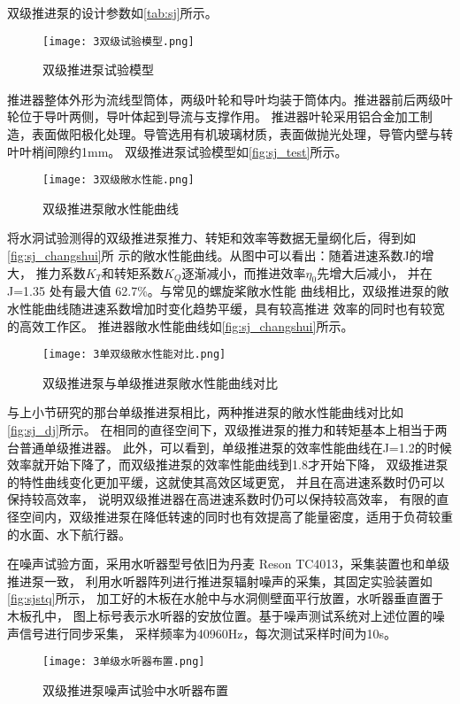 双级推进泵的设计参数如\autoref{tab:sj}所示。
\begin{figure}[htbp]
    \centering
    \texttt{[image: 3双级试验模型.png]}
    \caption{\label{fig:sj_test}双级推进泵试验模型}
\end{figure}
推进器整体外形为流线型筒体，两级叶轮和导叶均装于筒体内。推进器前后两级叶轮位于导叶两侧，导叶体起到导流与支撑作用。
推进器叶轮采用铝合金加工制造，表面做阳极化处理。导管选用有机玻璃材质，表面做抛光处理，导管内壁与转叶叶梢间隙约1mm。
双级推进泵试验模型如\autoref{fig:sj_test}所示。
\begin{figure}[htbp]
    \centering
    \texttt{[image: 3双级敞水性能.png]}
    \caption{\label{fig:sj_changshui}双级推进泵敞水性能曲线}
\end{figure}

将水洞试验测得的双级推进泵推力、转矩和效率等数据无量纲化后，得到如\autoref{fig:sj_changshui}所
示的敞水性能曲线。从图中可以看出：随着进速系数J的增大，
推力系数$K_T$和转矩系数$K_Q$逐渐减小，而推进效率$\eta_0$先增大后减小，
并在 J=1.35 处有最大值 62.7\%。与常见的螺旋桨敞水性能
曲线相比，双级推进泵的敞水性能曲线随进速系数增加时变化趋势平缓，具有较高推进
效率的同时也有较宽的高效工作区。
推进器敞水性能曲线如\autoref{fig:sj_changshui}所示。
\begin{figure}[htbp]
    \centering
    \texttt{[image: 3单双级敞水性能对比.png]}
    \caption{\label{fig:sj_dj}双级推进泵与单级推进泵敞水性能曲线对比}
\end{figure}

与上小节研究的那台单级推进泵相比，两种推进泵的敞水性能曲线对比如\autoref{fig:sj_dj}所示。
在相同的直径空间下，双级推进泵的推力和转矩基本上相当于两台普通单级推进器。
此外，可以看到，单级推进泵的效率性能曲线在J=1.2的时候效率就开始下降了，而双级推进泵的效率性能曲线到1.8才开始下降，
双级推进泵的特性曲线变化更加平缓，这就使其高效区域更宽，
并且在高进速系数时仍可以保持较高效率，
说明双级推进器在高进速系数时仍可以保持较高效率，
有限的直径空间内，双级推进泵在降低转速的同时也有效提高了能量密度，适用于负荷较重的水面、水下航行器。


在噪声试验方面，采用水听器型号依旧为丹麦 Reson TC4013，采集装置也和单级推进泵一致，
利用水听器阵列进行推进泵辐射噪声的采集，其固定实验装置如\autoref{fig:sjstq}所示，
加工好的木板在水舱中与水洞侧壁面平行放置，水听器垂直置于木板孔中，
图上标号表示水听器的安放位置。基于噪声测试系统对上述位置的噪声信号进行同步采集，
采样频率为40960Hz，每次测试采样时间为10s。
\begin{figure}[htbp]
    \centering
    \texttt{[image: 3单级水听器布置.png]}
    \caption{\label{fig:sjstq}双级推进泵噪声试验中水听器布置}
\end{figure}
